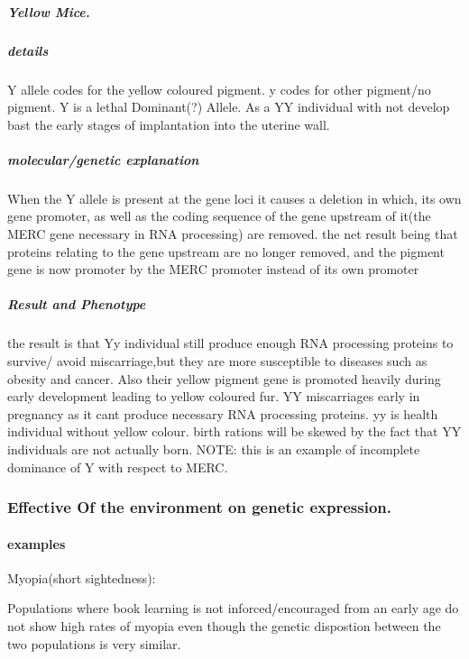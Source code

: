 \documentclass[]{article}
\let\oldparagraph\paragraph
\renewcommand{\paragraph}[1]{\oldparagraph{#1}\mbox{}}
\let\oldsubparagraph\subparagraph
\renewcommand{\subparagraph}[1]{\oldsubparagraph{#1}\mbox{}}
\begin{document}
\hypertarget{yellow-mice.}{%
\subparagraph{Yellow Mice.}\label{yellow-mice.}}

\hypertarget{details-4}{%
\subparagraph{details}\label{details-4}}

Y allele codes for the yellow coloured pigment. y codes for other
pigment/no pigment. Y is a lethal Dominant(?) Allele. As a YY individual
with not develop bast the early stages of implantation into the uterine
wall.

\hypertarget{moleculargenetic-explanation}{%
\subparagraph{molecular/genetic
explanation}\label{moleculargenetic-explanation}}

When the Y allele is present at the gene loci it causes a deletion in
which, its own gene promoter, as well as the coding sequence of the gene
upstream of it(the MERC gene necessary in RNA processing) are removed.
the net result being that proteins relating to the gene upstream are no
longer removed, and the pigment gene is now promoter by the MERC
promoter instead of its own promoter

\hypertarget{result-and-phenotype}{%
\subparagraph{Result and Phenotype}\label{result-and-phenotype}}

the result is that Yy individual still produce enough RNA processing
proteins to survive/ avoid miscarriage,but they are more susceptible to
diseases such as obesity and cancer. Also their yellow pigment gene is
promoted heavily during early development leading to yellow coloured
fur. YY miscarriages early in pregnancy as it cant produce necessary RNA
processing proteins. yy is health individual without yellow colour.
birth rations will be skewed by the fact that YY individuals are not
actually born. NOTE: this is an example of incomplete dominance of Y
with respect to MERC.

\hypertarget{effective-of-the-environment-on-genetic-expression.}{%
\subsubsection{Effective Of the environment on genetic
expression.}\label{effective-of-the-environment-on-genetic-expression.}}

\hypertarget{examples-4}{%
\paragraph{examples}\label{examples-4}}

Myopia(short sightedness):

Populations where book learning is not inforced/encouraged from an early
age do not show high rates of myopia even though the genetic dispostion
between the two populations is very similar.
\end{document}
